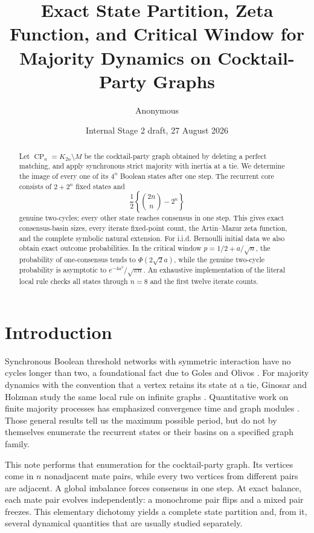 \documentclass[11pt,a4paper]{amsart}
\title[Cocktail-party majority dynamics]{Exact State Partition, Zeta Function, and Critical Window for Majority Dynamics on Cocktail-Party Graphs}
\author{Anonymous}
\date{Internal Stage 2 draft, 27 August 2026}
\theoremstyle{definition}
\theoremstyle{remark}
\newcommand{\CP}{\operatorname{CP}}
\begin{document}
\begin{abstract}
Let $\CP_n=K_{2n}\setminus M$ be the cocktail-party graph obtained by
deleting a perfect matching, and apply synchronous strict majority with
inertia at a tie.  We determine the image of every one of its $4^n$ Boolean
states after one step.  The recurrent core consists of $2+2^n$ fixed states
and
\[
 \frac{1}{2}\left\{\binom{2n}{n}-2^n\right\}
\]
genuine two-cycles; every other state reaches consensus in one step.  This
gives exact consensus-basin sizes, every iterate fixed-point count, the
Artin--Mazur zeta function, and the complete symbolic natural extension.  For
i.i.d. Bernoulli initial data we also obtain exact outcome probabilities.  In
the critical window $p=1/2+a/\sqrt n$, the probability of one-consensus tends
to $\Phi(2\sqrt2a)$, while the genuine two-cycle probability is asymptotic to
$e^{-4a^2}/\sqrt{\pi n}$.  An exhaustive implementation of the literal local
rule checks all states through $n=8$ and the first twelve iterate counts.
\end{abstract}

\maketitle

\section{Introduction}

Synchronous Boolean threshold networks with symmetric interaction have no
cycles longer than two, a foundational fact due to Goles and Olivos
\cite{GolesOlivos1980}.  For majority dynamics with the convention that a
vertex retains its state at a tie, Ginosar and Holzman study the same local
rule on infinite graphs \cite{GinosarHolzman2000}.  Quantitative work on
finite majority processes has emphasized convergence time and graph modules
\cite{KaaserEtAl2016}.  Those general results tell us the maximum possible
period, but do not by themselves enumerate the recurrent states or their
basins on a specified graph family.

This note performs that enumeration for the cocktail-party graph.  Its
vertices come in $n$ nonadjacent mate pairs, while every two vertices from
different pairs are adjacent.  A global imbalance forces consensus in one
step.  At exact balance, each mate pair evolves independently: a monochrome
pair flips and a mixed pair freezes.  This elementary dichotomy yields a
complete state partition and, from it, several dynamical quantities that are
usually studied separately.
\end{document}
